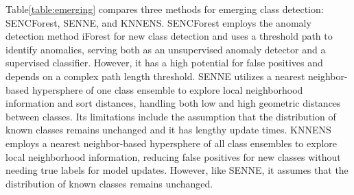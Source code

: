         Table\ref{table:emerging} compares three methods for emerging class detection: SENCForest, SENNE, and KNNENS. SENCForest employs the anomaly detection method iForest for new class detection and uses a threshold path to identify anomalies, serving both as an unsupervised anomaly detector and a supervised classifier. However, it has a high potential for false positives and depends on a complex path length threshold. SENNE utilizes a nearest neighbor-based hypersphere of one class ensemble to explore local neighborhood information and sort distances, handling both low and high geometric distances between classes. Its limitations include the assumption that the distribution of known classes remains unchanged and it has lengthy update times. KNNENS employs a nearest neighbor-based hypersphere of all class ensembles to explore local neighborhood information, reducing false positives for new classes without needing true labels for model updates. However, like SENNE, it assumes that the distribution of known classes remains unchanged.


